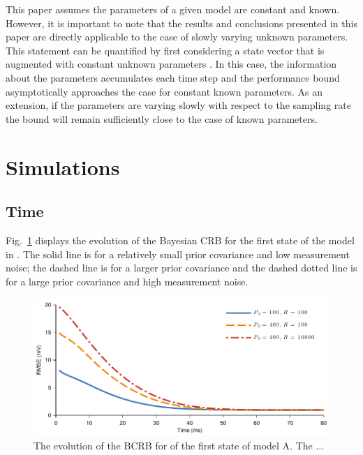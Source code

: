 \documentclass{article}
\begin{document}
This paper assumes the parameters of a given model are constant and known. However, it is important to note that the results and conclusions presented in this paper are directly applicable to the case of slowly varying unknown parameters. This statement can be quantified by first considering a state vector that is augmented with constant unknown parameters \cite{sdf}. In this case, the information about the parameters accumulates each time step and the performance bound asymptotically approaches the case for constant known parameters. As an extension, if the parameters are varying slowly with respect to the sampling rate the bound will remain sufficiently close to the case of known parameters.

\section{Simulations}\label{sec:Simulations}

\subsection{Time}

Fig.~\ref{fig:DynamicCRB} displays the evolution of the Bayesian CRB for the first state of the model in \cite{Silva1974}. The solid line is for a relatively small prior covariance and low measurement noise; the dashed line is for a larger prior covariance and the dashed dotted line is for a large prior covariance and high measurement noise.

\begin{figure}[ht]
  \begin{center}
    \includegraphics{./figures/pdf/DynamicCRB}
  \end{center}
  \caption{The evolution of the BCRB for of the first state of model A. The ... }
  \label{fig:DynamicCRB}
\end{figure}
\end{document}
